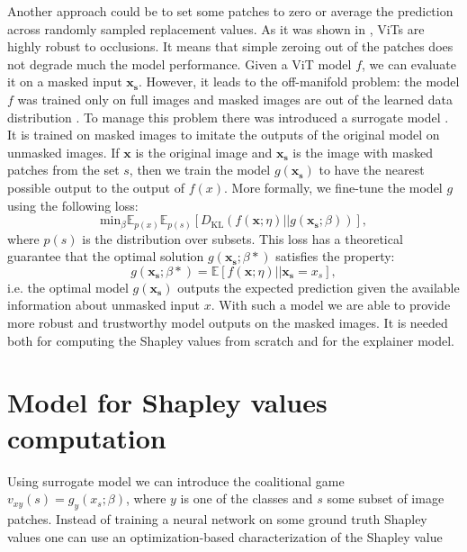 \documentclass[magisterska,en]{pracamgr}
\begin{document}
Another approach could be to set some patches to zero or average the prediction across randomly sampled replacement values. As it was shown in \cite{DBLP:conf/nips/NaseerRKHKY21}, ViTs are highly robust to occlusions. It means that simple zeroing out of the patches does not degrade much the model performance.  Given a ViT model $f$, we can evaluate it on a masked input $\mathbf{x_s}$. However, it leads to the off-manifold problem: the model $f$ was trained only on full images and masked images are out of the learned data distribution \cite{DBLP:conf/aistats/TaufiqBM23}.  To manage this problem there was introduced a surrogate model \cite{DBLP:conf/iclr/FryeMBCSF21}. It is trained on masked images to imitate the outputs of the original model on unmasked images. If $\mathbf{x}$ is the original image and $\mathbf{x_s}$ is the image with masked patches from the set $s$, then we train the model $g(\mathbf{x_s})$ to have the nearest possible output to the output of $f(x)$. More formally, we fine-tune the model $g$ using the following loss:
\begin{equation*}
    \textrm{min}_{\beta} \mathbb{E}_{p(x)} \mathbb{E}_{p(s)} \left[D_{\textrm{KL}} \left(f(\mathbf{x};\eta) || g(\mathbf{x_s};\beta)\right)\right],
\end{equation*}
where $p(s)$ is the distribution over subsets. This loss has a theoretical guarantee that the optimal solution $g(\mathbf{x_s};\beta*)$ satisfies the property:
\begin{equation*}
    g(\mathbf{x_s};\beta*) = \mathbb{E}\left[f(\mathbf{x};\eta) || \mathbf{x_s}=x_s \right],
\end{equation*}
i.e. the optimal model $g(\mathbf{x_s})$ outputs the expected prediction given the available information about unmasked input $x$. With such a model we are able to provide more robust and trustworthy model outputs on the masked images. It is needed both for computing the Shapley values from scratch and for the explainer model.

\section{Model for Shapley values computation}\label{s:model}
Using surrogate model we can introduce the coalitional game $v_{xy}(s) = g_y(x_s;\beta)$, where $y$ is one of the classes and $s$ some subset of image patches. Instead of training a neural network on some ground truth Shapley values one can use an optimization-based characterization of the Shapley value 
\end{document}
